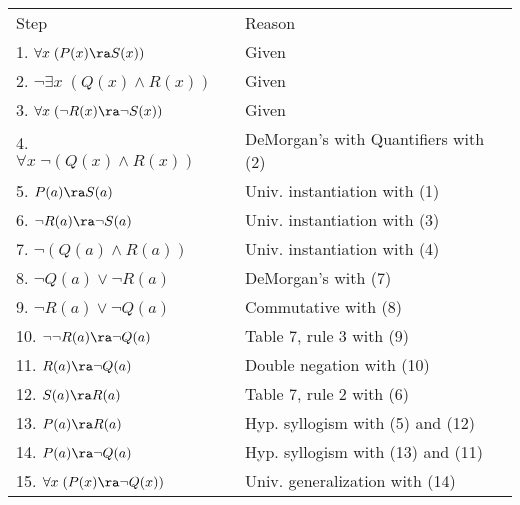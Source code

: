 \begin{questions}
\begin{solution}
    \begin{tabular}{lll}
            Step                    & \hspace{0.15in} & Reason \\
            1. $\forall x\; (P(x) \ra S(x))$            & & Given \\
            2. $\neg \exists x\; (Q(x) \wedge R(x))$    & & Given \\
            3. $\forall x\; (\neg R(x) \ra \neg S(x))$  & & Given \\
            4. $\forall x\; \neg (Q(x) \wedge R(x))$    & & DeMorgan's with Quantifiers with (2) \\
            5. $P(a) \ra S(a)$                          & & Univ. instantiation with (1) \\
            6. $\neg R(a) \ra \neg S(a)$                & & Univ. instantiation with (3) \\
            7. $\neg (Q(a) \wedge R(a))$                & & Univ. instantiation with (4) \\
            8. $\neg Q(a) \vee \neg R(a)$               & & DeMorgan's with (7) \\
            9. $\neg R(a) \vee \neg Q(a)$               & & Commutative with (8) \\
            10. $\neg \neg R(a) \ra \neg Q(a)$          & & Table 7, rule 3 with (9) \\
            11. $R(a) \ra \neg Q(a)$                    & & Double negation with (10) \\
            12. $S(a) \ra R(a)$                         & & Table 7, rule 2 with (6) \\
            13. $P(a) \ra R(a)$                         & & Hyp. syllogism with (5) and (12) \\
            14. $P(a) \ra \neg Q(a)$                    & & Hyp. syllogism with (13) and (11) \\
            15. $\forall x\; (P(x) \ra \neg Q(x))$      & & Univ. generalization with (14)
    \end{tabular}
\end{solution}



\end{questions}
